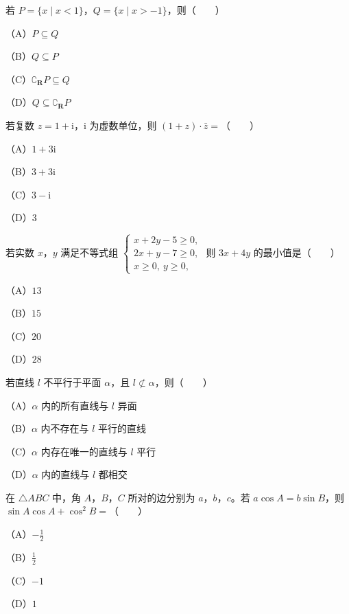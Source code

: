 

\begin{question}
若 $P=\{x\mid x<1\}$，$Q=\{x\mid x>-1\}$，则\mbox{（　　）}

（A）$P\subseteq Q$

（B）$Q\subseteq P$

（C）$\complement_{\mathbf R}P\subseteq Q$

（D）$Q\subseteq\complement_{\mathbf R}P$

\end{question}
\begin{question}
若复数 $z=1+\mathrm i$，$\mathrm i$ 为虚数单位，则 $(1+z)\cdot\bar z=$\mbox{（　　）}

（A）$1+3\mathrm i$

（B）$3+3\mathrm i$

（C）$3-\mathrm i$

（D）$3$

\end{question}
\begin{question}
若实数 $x$，$y$ 满足不等式组 $\begin{cases}x+2y-5\geqslant0,\\2x+y-7\geqslant0,\\x\geqslant0,\ y\geqslant0,\end{cases}$ 则 $3x+4y$ 的最小值是\mbox{（　　）}

（A）$13$

（B）$15$

（C）$20$

（D）$28$

\end{question}
\begin{question}
若直线 $l$ 不平行于平面 $\alpha$，且 $l\not\subset\alpha$，则\mbox{（　　）}

（A）$\alpha$ 内的所有直线与 $l$ 异面

（B）$\alpha$ 内不存在与 $l$ 平行的直线

（C）$\alpha$ 内存在唯一的直线与 $l$ 平行

（D）$\alpha$ 内的直线与 $l$ 都相交

\end{question}
\begin{question}
在 $\triangle ABC$ 中，角 $A$，$B$，$C$ 所对的边分别为 $a$，$b$，$c$。若 $a\cos A=b\sin B$，则 $\sin A\cos A+\cos^2B=$\mbox{（　　）}

（A）$-\frac12$

（B）$\frac12$

（C）$-1$

（D）$1$

\end{question}
